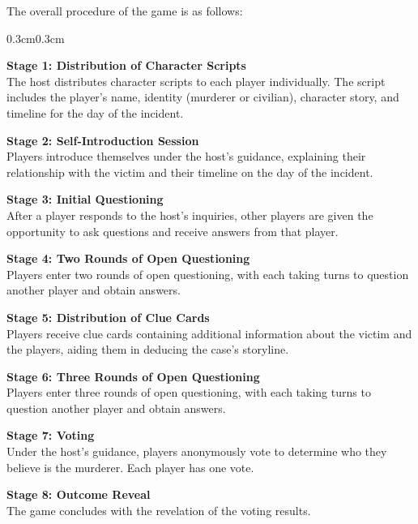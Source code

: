 \documentclass[11pt]{article}
\begin{document}
The overall procedure of the game is as follows:
{
\setlength{\parindent}{0pt}
\setlength{\parskip}{0.8em}
{
\begin{adjustwidth}{0.3cm}{0.3cm}
\raggedright\ttfamily
\noindent \textbf{Stage 1: Distribution of Character Scripts} \\
The host distributes character scripts to each player individually. The script includes the player's name, identity (murderer or civilian), character story, and timeline for the day of the incident.

\textbf{Stage 2: Self-Introduction Session} \\
Players introduce themselves under the host's guidance, explaining their relationship with the victim and their timeline on the day of the incident.

\textbf{Stage 3: Initial Questioning} \\
After a player responds to the host's inquiries, other players are given the opportunity to ask questions and receive answers from that player.

\textbf{Stage 4: Two Rounds of Open Questioning} \\
Players enter two rounds of open questioning, with each taking turns to question another player and obtain answers.

\textbf{Stage 5: Distribution of Clue Cards} \\
Players receive clue cards containing additional information about the victim and the players, aiding them in deducing the case's storyline.

\textbf{Stage 6: Three Rounds of Open Questioning} \\
Players enter three rounds of open questioning, with each taking turns to question another player and obtain answers.

\textbf{Stage 7: Voting} \\
Under the host's guidance, players anonymously vote to determine who they believe is the murderer. Each player has one vote.

\textbf{Stage 8: Outcome Reveal} \\
The game concludes with the revelation of the voting results.

\end{adjustwidth}
}


}
\end{document}
